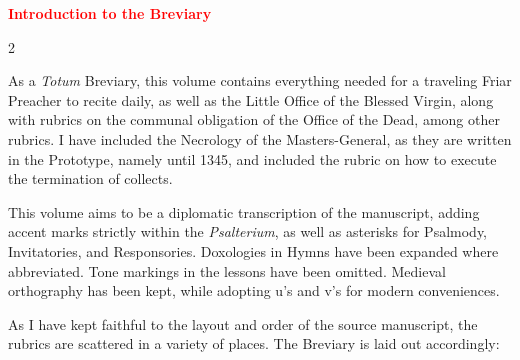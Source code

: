 \begin{center}
\large\textcolor{Red}{\textbf{Introduction to the Breviary}}
\end{center}

\begin{multicols}{2}




{\color{Red} }

As a \emph{Totum} Breviary, this volume contains everything needed for a traveling Friar Preacher to recite daily, as well as the Little Office of the Blessed Virgin, along with rubrics on the communal obligation of the Office of the Dead, among other rubrics. I have included the Necrology of the Masters-General, as they are written in the Prototype, namely until 1345, and included the rubric on how to execute the termination of collects.

This volume aims to be a diplomatic transcription of the manuscript, adding accent marks strictly within the \emph{Psalterium}, as well as asterisks for Psalmody, Invitatories, and Responsories. Doxologies in Hymns have been expanded where abbreviated. Tone markings in the lessons have been omitted. Medieval orthography has been kept, while adopting u's and v's for modern conveniences.


As I have kept faithful to the layout and order of the source manuscript, the rubrics are scattered in a variety of places. The Breviary is laid out accordingly:


\end{multicols}
